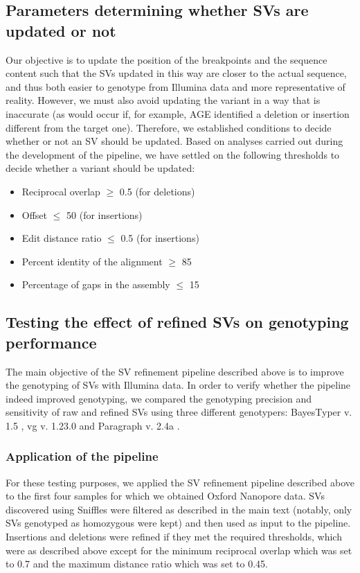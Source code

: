 \documentclass[12pt]{article}
\begin{document}
\subsection{Parameters determining whether SVs are updated or not}

Our objective is to update the position of the breakpoints and the sequence content such that the SVs updated in this way are closer to the actual sequence, and thus both easier to genotype from Illumina data and more representative of reality.
However, we must also avoid updating the variant in a way that is inaccurate (as would occur if, for example, AGE identified a deletion or insertion different from the target one).
Therefore, we established conditions to decide whether or not an SV should be updated.
Based on analyses carried out during the development of the pipeline, we have settled on the following thresholds to decide whether a variant should be updated:

\begin{itemize}
\item Reciprocal overlap $\geq$ 0.5 (for deletions)
\item Offset $\leq$ 50 (for insertions)
\item Edit distance ratio $\leq$ 0.5 (for insertions)
\item Percent identity of the alignment $\geq$ 85
\item Percentage of gaps in the assembly $\leq$ 15
\end{itemize}

\subsection{Testing the effect of refined SVs on genotyping performance}

The main objective of the SV refinement pipeline described above is to improve the genotyping of SVs with Illumina data.
In order to verify whether the pipeline indeed improved genotyping, we compared the genotyping precision and sensitivity of raw and refined SVs using three different genotypers: BayesTyper v. 1.5 \citep{bayestyper}, vg v. 1.23.0 \citep{vg} and Paragraph v. 2.4a \citep{paragraph}.

\subsubsection{Application of the pipeline}

For these testing purposes, we applied the SV refinement pipeline described above to the first four samples for which we obtained Oxford Nanopore data.
SVs discovered using Sniffles were filtered as described in the main text (notably, only SVs genotyped as homozygous were kept) and then used as input to the pipeline.
Insertions and deletions were refined if they met the required thresholds, which were as described above except for the minimum reciprocal overlap which was set to 0.7 and the maximum distance ratio which was set to 0.45.
\end{document}
